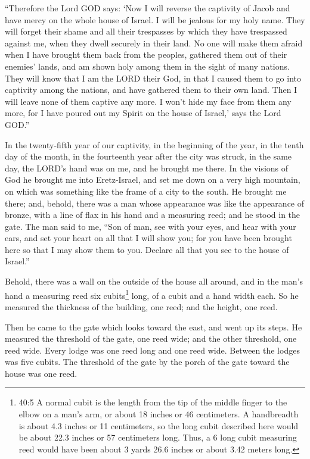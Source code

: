 \myverse{}“Therefore the Lord GOD says: ‘Now I will reverse the captivity
of Jacob and have mercy on the whole house of Israel. I will be jealous for my holy name.
\myverse{}They will forget their shame and all their trespasses by which they have
trespassed against me, when they dwell securely in their land. No one will make them afraid
\myverse{}when I have brought them back from the peoples, gathered them out of their
enemies’ lands, and am shown holy among them in the sight of many nations.
\myverse{}They will know that I am the LORD their God, in that I caused them to go
into captivity among the nations, and have gathered them to their own land. Then I will leave none of
them captive any more.
\myverse{}I won’t hide my face from them any more, for I have poured out my Spirit
on the house of Israel,’ says the Lord GOD.”


\mychapter{} \myverse*{}In the twenty-fifth year of our captivity, in the beginning of
the year, in the tenth day of the month, in the fourteenth year after the city was struck, in the same
day, the LORD’s hand was on me, and he brought me there.
\myverse{}In the visions of God he brought me into Eretz-Israel, and set me down on a
very high mountain, on which was something like the frame of a city to the south.
\myverse{}He brought me there; and, behold, there was a man whose appearance was like
the appearance of bronze, with a line of flax in his hand and a measuring reed; and he stood in the gate.
\myverse{}The man said to me, “Son of man, see with your eyes, and hear with your ears,
and set your heart on all that I will show you; for you have been brought here so that I may show them
to you. Declare all that you see to the house of Israel.”

\myverse{}Behold, there was a wall on the outside of the house all around,
and in the man’s hand a measuring reed six cubits\footnote{40:5 A normal cubit is the length from the tip of the middle finger to the elbow on a man’s arm, or
	about 18 inches or 46 centimeters. A handbreadth is about 4.3 inches or 11 centimeters, so the long cubit
	described here would be about 22.3 inches or 57 centimeters long. Thus, a 6 long cubit measuring reed
	would have been about 3 yards 26.6 inches or about 3.42 meters long.} long, of a cubit and a hand
width each. So he measured the thickness of the building, one reed; and the height, one reed.

\myverse{}Then he came to the gate which looks toward the east, and went
up its steps. He measured the threshold of the gate, one reed wide; and the other threshold, one reed
wide.
\myverse{}Every lodge was one reed long and one reed wide. Between the lodges was five
cubits. The threshold of the gate by the porch of the gate toward the house was one reed.

